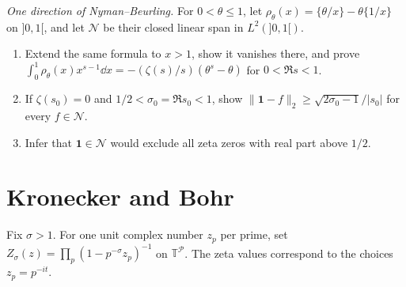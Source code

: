 \begin{exercise}[$\star\star\star$]\label{pb:nyman}
\emph{One direction of Nyman--Beurling.} For $0<\theta\le1$, let $\rho_\theta(x)=\{\theta/x\}-\theta\{1/x\}$ on $]0,1[$, and let $\mathcal N$ be their closed linear span in $L^2(]0,1[)$.
\begin{enumerate}[label=(\alph*)]
\item Extend the same formula to $x>1$, show it vanishes there, and prove $\int_0^1\rho_\theta(x)x^{s-1}\dd x=-(\zeta(s)/s)(\theta^s-\theta)$ for $0<\Re s<1$.
\item If $\zeta(s_0)=0$ and $1/2<\sigma_0=\Re s_0<1$, show $\|\mathbf1-f\|_2\ge\sqrt{2\sigma_0-1}/|s_0|$ for every $f\in\mathcal N$.
\item Infer that $\mathbf1\in\mathcal N$ would exclude all zeta zeros with real part above $1/2$.
\end{enumerate}
\end{exercise}
\section{Kronecker and Bohr}

Fix $\sigma>1$. For one unit complex number $z_p$ per prime, set $Z_\sigma(z)=\prod_p(1-p^{-\sigma}z_p)^{-1}$ on $\mathbb T^{\mathcal P}$. The zeta values correspond to the choices $z_p=p^{-it}$.

